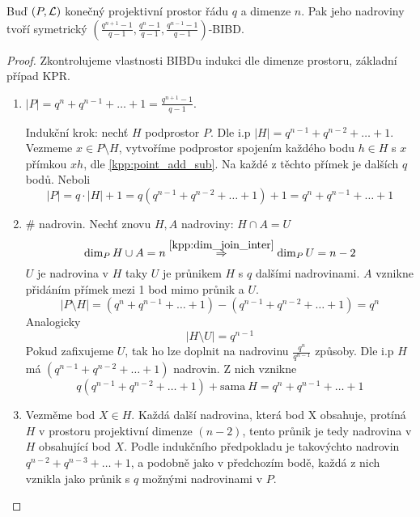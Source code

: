 \begin{theorem}
    Buď $(P,\operatorname{\mathcal{L}})$ konečný projektivní prostor řádu $q$ a dimenze $n$.
    Pak jeho nadroviny tvoří symetrický $(\frac{q^{n+1}-1}{q-1},\frac{q^n-1}{q-1},\frac{q^{n-1}-1}{q-1})$-BIBD.
\end{theorem}
\begin{proof}
	Zkontrolujeme vlastnosti BIBDu indukci dle dimenze prostoru, základní případ KPR.
    \begin{enumerate}
	    \item $|P| = q^n + q^{n - 1} + \ldots + 1 = \frac{q^{n+1}-1}{q-1}$.

		    Indukční krok: nechť $H$ podprostor $P$.
		    Dle i.p $|H| = q^{n - 1} + q^{n - 2} + \ldots + 1$.
		    Vezmeme $x \in P \setminus H$, vytvoříme podprostor spojením každého bodu $h \in H$ s $x$ přímkou $xh$, dle \cref{kpp:point_add_sub}.
		    Na každé z těchto přímek je dalších $q$ bodů.
		    Neboli
		    \[ |P| = q \cdot |H| + 1 = q(q^{n - 1} + q^{n - 2} + \ldots + 1) + 1 = q^n + q^{n - 1} + \ldots + 1 \]
	    \item \# nadrovin.
		    Nechť znovu $H, A$ nadroviny: $H \cap A = U$
		    \[ \dim_P H \cup A = n \stackrel{\cref{kpp:dim_join_inter}}{\Rightarrow} \dim_P U = n - 2 \]
		    $U$ je nadrovina v $H$ taky $U$ je průnikem $H$ s $q$ dalšími nadrovinami.
		    $A$ vznikne přidáním přímek mezi 1 bod mimo průnik a $U$.
		    \[ |P \setminus H| = (q^n + q^{n - 1} + \ldots + 1) - (q^{n - 1} + q^{n - 2} + \ldots + 1) = q^n \]
		    Analogicky
		    \[ |H \setminus U| = q^{n - 1} \]
		    Pokud zafixujeme $U$, tak ho lze doplnit na nadrovinu $\frac{q^n}{q^{n - 1}}$ způsoby.
		    Dle i.p $H$ má $(q^{n - 1} + q^{n - 2} + \ldots + 1)$ nadrovin.
		    Z nich vznikne
		    \[ q(q^{n - 1} + q^{n - 2} + \ldots + 1) + \text{sama}\ H = q^n + q^{n - 1} + \ldots + 1 \]
	    \item Vezměme bod $X \in H$.
		    Každá další nadrovina, která bod X obsahuje, protíná $H$ v prostoru projektivní dimenze $(n - 2)$, tento průnik je tedy nadrovina v $H$ obsahující bod $X$.
		    Podle indukčního předpokladu je takovýchto nadrovin $q^{n-2} + q^{n-3} + \ldots + 1$, a podobně jako v předchozím bodě, každá z nich vznikla jako průnik s $q$ možnými nadrovinami v $P$.
    \end{enumerate}
\end{proof}

